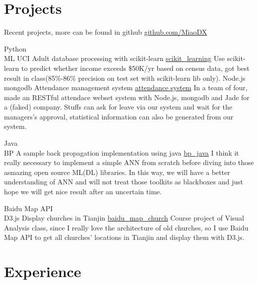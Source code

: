 \documentclass[letterpaper]{twentysecondcv} %
\begin{document}
\section{Projects}
\begin{twenty}
    \twentyitem
        {}
        {Recent projects, more can be found in github}
        {\href{https://github.com/MiaoDX/}{github.com/MiaoDX}}
        {}
  		{}
  	
        
	\twentyitem
		{Python \\ ML}
        {UCI Adult database processing with scikit-learn}
        {\href{https://github.com/MiaoDX/scikit\_learning/}{scikit\_learning}}
        {}
        {Use scikit-learn to predict whether income exceeds \$50K/yr based on census data, got best result in class(85\%-86\% precision on test set with scikit-learn lib only).}
	\twentyitem
		{Node.js \\ mongodb}
		{Attendance management system}
		{\href{https://github.com/SEAPC2016/attendance}{attendance system}}
		{}
		{In a team of four, made an RESTful attendace webset system with Node.js, mongodb and Jade for a (faked) company. Stuffs can ask for leave via our system and wait for the managers's approval, statistical information can also be generated from our system.}
		
	\twentyitem
		{Java \\ BP}
		{A sample back propagation implementation using java}
		{\href{https://github.com/MiaoDX/bp_java}{bp\_java}}
		{}				
		{I think it really necessary to implement a simple ANN from scratch before diving into those asmazing open source ML(\/DL) libraries. In this way, we will have a better understanding of ANN and will not treat those toolkits as blackboxes and just hope we will get nice result after an uncertain time.}
		
	\twentyitem
		{Baidu Map API  \\ D3.js}
		{Display churches in Tianjin}
		{\href{https://github.com/MiaoDX/baidu\_map\_church}{baidu\_map\_church}}	
		{}
		{Course project of Visual Analysis class, since I really love the architecture of old churches, so I use Baidu Map API to get all churches' locations in Tianjin and display them with D3.js.}	
\end{twenty}


\section{Experience}
\end{document}
